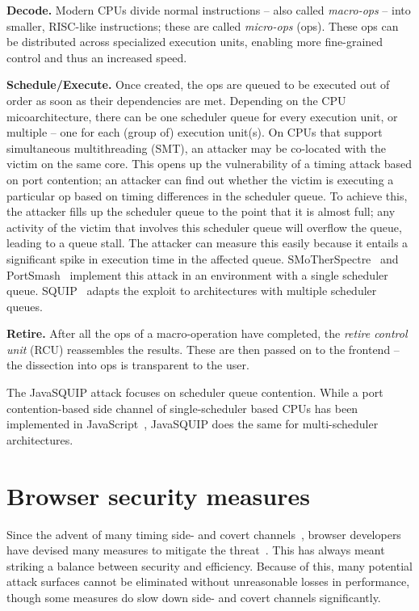 \documentclass[11pt,
  titlepage=false,
]{scrreprt}
\begin{document}
\textbf{Decode.}
Modern CPUs divide normal instructions -- also called \textit{macro-ops} -- into smaller, RISC-like instructions;
these are called \textit{micro-ops} (\textmu ops).
These \textmu ops can be distributed across specialized execution units, enabling more fine-grained control and thus an increased speed.

\textbf{Schedule/Execute.}
Once created, the \textmu ops are queued to be executed out of order as soon as their dependencies are met.
Depending on the CPU micoarchitecture, there can be one scheduler queue for every execution unit, or multiple -- one for each (group of) execution unit(s).
On CPUs that support simultaneous multithreading (SMT), an attacker may be co-located with the victim on the same core.
This opens up the vulnerability of a timing attack based on port contention;
an attacker can find out whether the victim is executing a particular \textmu op based on timing differences in the scheduler queue.
To achieve this, the attacker fills up the scheduler queue to the point that it is almost full;
any activity of the victim that involves this scheduler queue will overflow the queue, leading to a queue stall.
The attacker can measure this easily because it entails a significant spike in execution time in the affected queue.
SMoTherSpectre~\cite{Bhattacharyya2019} and PortSmash~\cite{Aldaya2019port} implement this attack in an environment with a single scheduler queue.
SQUIP~\cite{squip} adapts the exploit to architectures with multiple scheduler queues.

\textbf{Retire.}
After all the \textmu ops of a macro-operation have completed, the \textit{retire control unit} (RCU) reassembles the results.
These are then passed on to the frontend -- the dissection into \textmu ops is transparent to the user.

The JavaSQUIP attack focuses on scheduler queue contention.
While a port contention-based side channel of single-scheduler based CPUs has been implemented in JavaScript~\cite{Rokicki2022webport},
JavaSQUIP does the same for multi-scheduler architectures.

\section{Browser security measures}
\label{sec:browsersecurity}
Since the advent of many timing side- and covert channels~\cite{spKocherHFGGHHLM019, Bhattacharyya2019, Rokicki2022webport}, browser developers have devised many measures to mitigate the threat~\cite{shusterman2021prime}.
This has always meant striking a balance between security and efficiency.
Because of this, many potential attack surfaces cannot be eliminated without unreasonable losses in performance, though  some measures do slow down side- and covert channels significantly.
\end{document}
